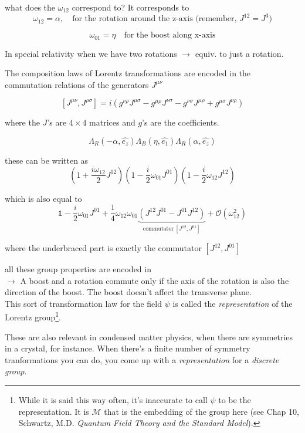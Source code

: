 \documentclass[11pt]{article}
\begin{document}
 
 what does the $\omega_{12}$ correspond to? It corresponds to \[\omega_{12} = \alpha, \quad \text{for the rotation around the z-axis (remember, $J^{12} = J^3$)}\]
 
 \vspace{-16pt}
 \[ \omega_{01} = \eta \quad \text{for the boost along x-axis}\]
 
 In special relativity when we have two rotations $\rightarrow$ equiv. to just a rotation.
 
 The composition laws of Lorentz transformations are encoded in the commutation relations of the generators $J^{\mu\nu}$
 
 
 \[ [ J^{\mu\nu}, J^{\rho\sigma}] = i(g^{\nu\rho}J^{\mu\sigma} - g^{\mu\rho} J^{\nu\sigma} - g^{\nu\sigma} J^{\mu\rho} + g^{\mu\sigma} J^{\nu\rho})\]
 
 where the $J$'s are $4\times 4$ matrices and $g$'s are the coefficients.
 
 \[ \Lambda_R(-\alpha, \hat{e_z}) \Lambda_B(\eta, \hat{e_1}) \Lambda_R(\alpha, \hat{e_z}) \]
 
 these can be written as \[ \left( 1 + \frac{i\omega_{12}}{2}J^{12} \right) \left( 1 - \frac{i}{2} \omega_{01}J^{01}\right)  \left(1 - \frac{i}{2} \omega_{12} J^{12}\right) \]
 
 which is also equal to \[ \mathbb{1} - \frac{i}{2}\omega_{01}J^{01} + \frac{1}{4} \omega_{12}\omega_{01} \underbrace{(J^{12} J^{01} - J^{01}J^{12})}_{\text{commutator}\ [J^{12}, J^{01}]} + \mathcal{O}(\omega_{12}^2)\]
 
 where the underbraced part is exactly the commutator $[J^{12}, J^{01}]$
 
 all these group properties are encoded in \\
 
 $\rightarrow$ A boost and a rotation commute only if the axis of the rotation is also the direction of the boost. The boost doesn't affect the transverse plane.\\

	This sort of transformation law for the field $\psi$ is called the \textit{representation} of the Lorentz group\footnote{While it is said this way often, it's inaccurate to call $\psi$ to be the representation. It is $\mathcal{M}$ that is the embedding of the group here (see Chap 10, Schwartz, M.D. \textit{Quantum Field Theory and the Standard Model}).}.
	
	These are also relevant in condensed matter physics, when there are symmetries in a crystal, for instance. When there's a finite number of symmetry tranformations you can do, you come up with a \textit{representation} for a \textit{discrete group}.
	
\end{document}
